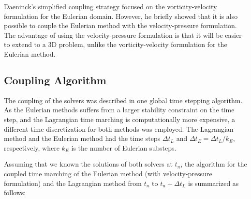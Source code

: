 	Daeninck's simplified coupling strategy focused on the vorticity-velocity formulation for the Eulerian domain. However, he briefly showed that it is also possible to couple the Eulerian method with the velocity-pressure formulation. The advantage of using the velocity-pressure formulation is that it will be easier to extend to a 3D problem, unlike the vorticity-velocity formulation for the Eulerian method.
	
	\subsection{Coupling Algorithm}	
	\label{subsec:hybrid-ca}
	The coupling of the solvers was described in one global time stepping algorithm. As the Eulerian methods suffers from a larger stability constraint on the time step, and the Lagrangian time marching is computationally more expensive, a  different time discretization for both methods was employed. The Lagrangian method and the Eulerian method had the time steps $\Delta t_L$ and $\Delta t_E=\Delta t_L/k_E$, respectively, where $k_E$ is the number of Eulerian substeps.
	
	Assuming that we known the solutions of both solvers at $t_n$, the algorithm for the coupled time marching of the Eulerian method (with velocity-pressure formulation) and the Lagrangian method from $t_n$ to $t_n+\Delta t_L$ is summarized as follows:
	
